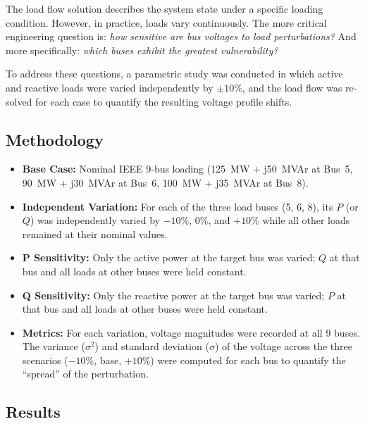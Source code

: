 \documentclass[12pt, a4paper]{article}
\begin{document}
The load flow solution describes the system state under a specific loading condition. However, in practice, loads vary continuously. The more critical engineering question is: \textit{how sensitive are bus voltages to load perturbations?} And more specifically: \textit{which buses exhibit the greatest vulnerability?}

To address these questions, a parametric study was conducted in which active and reactive loads were varied independently by $\pm 10\%$, and the load flow was re-solved for each case to quantify the resulting voltage profile shifts.

\subsection{Methodology}
\begin{itemize}
    \item \textbf{Base Case:} Nominal IEEE 9-bus loading (125~MW + j50~MVAr at Bus~5, 90~MW + j30~MVAr at Bus~6, 100~MW + j35~MVAr at Bus~8).
    \item \textbf{Independent Variation:} For each of the three load buses (5, 6, 8), its $P$ (or $Q$) was independently varied by $-10\%$, $0\%$, and $+10\%$ while all other loads remained at their nominal values.
    \item \textbf{P Sensitivity:} Only the active power at the target bus was varied; $Q$ at that bus and all loads at other buses were held constant.
    \item \textbf{Q Sensitivity:} Only the reactive power at the target bus was varied; $P$ at that bus and all loads at other buses were held constant.
    \item \textbf{Metrics:} For each variation, voltage magnitudes were recorded at all 9 buses. The variance ($\sigma^2$) and standard deviation ($\sigma$) of the voltage across the three scenarios ($-10\%$, base, $+10\%$) were computed for each bus to quantify the ``spread'' of the perturbation.
\end{itemize}

\subsection{Results}
\end{document}
